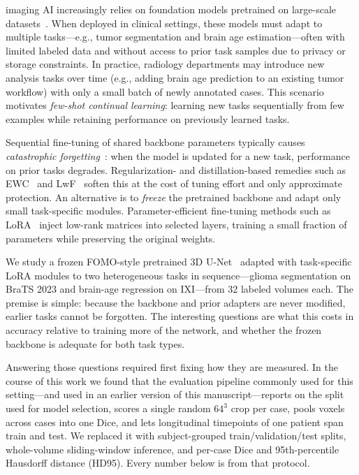 \documentclass[journal,twoside,web]{ieeecolor}
\begin{document}
 imaging AI increasingly relies on foundation models pretrained on large-scale datasets~\cite{fomo2025,baseline}. \label{sec:intro}
When deployed in clinical settings, these models must adapt to multiple tasks---e.g., tumor segmentation and brain age estimation---often with limited labeled data and without access to prior task samples due to privacy or storage constraints. In practice, radiology departments may introduce new analysis tasks over time (e.g., adding brain age prediction to an existing tumor workflow) with only a small batch of newly annotated cases. This scenario motivates \emph{few-shot continual learning}: learning new tasks sequentially from few examples while retaining performance on previously learned tasks.

Sequential fine-tuning of shared backbone parameters typically causes \emph{catastrophic forgetting}~\cite{kirkpatrick2017,mccloskey1989catastrophic}: when the model is updated for a new task, performance on prior tasks degrades. Regularization- and distillation-based remedies such as EWC~\cite{kirkpatrick2017} and LwF~\cite{li2017lwf} soften this at the cost of tuning effort and only approximate protection. An alternative is to \emph{freeze} the pretrained backbone and adapt only small task-specific modules. Parameter-efficient fine-tuning methods such as LoRA~\cite{hu2022lora, hu2024computational} inject low-rank matrices into selected layers, training a small fraction of parameters while preserving the original weights.

We study a frozen FOMO-style pretrained 3D U-Net~\cite{fomo2025} adapted with task-specific LoRA modules to two heterogeneous tasks in sequence---glioma segmentation on BraTS 2023 and brain-age regression on IXI---from 32 labeled volumes each. The premise is simple: because the backbone and prior adapters are never modified, earlier tasks cannot be forgotten. The interesting questions are what this costs in accuracy relative to training more of the network, and whether the frozen backbone is adequate for both task types.

Answering those questions required first fixing how they are measured. In the course of this work we found that the evaluation pipeline commonly used for this setting---and used in an earlier version of this manuscript---reports on the split used for model selection, scores a single random $64^3$ crop per case, pools voxels across cases into one Dice, and lets longitudinal timepoints of one patient span train and test. We replaced it with subject-grouped train/validation/test splits, whole-volume sliding-window inference, and per-case Dice and 95th-percentile Hausdorff distance (HD95). Every number below is from that protocol.
\end{document}
